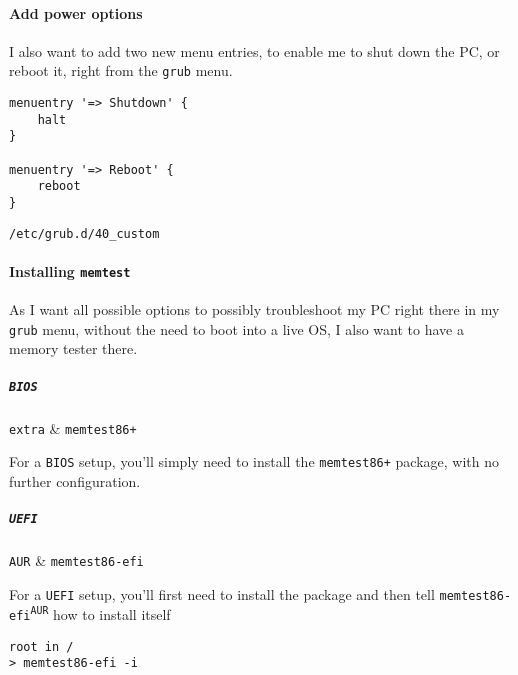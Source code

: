 \documentclass[10pt]{dustdoc}
\begin{document}
\paragraph{Add power options}%
\label{par:add-power-options}

I also want to add two new menu entries, to enable me to shut down the PC, or reboot it, right from the \texttt{grub} menu.

\begin{mintedlisting}
    \begin{verbatim}
menuentry '=> Shutdown' {
    halt
}

menuentry '=> Reboot' {
    reboot
}
    \end{verbatim}

    \caption{\texttt{/etc/grub.d/40_custom}}
\end{mintedlisting}

\paragraph{Installing \texttt{memtest}}%
\label{par:installing-memtest}

As I want all possible options to possibly troubleshoot my PC right there in my \texttt{grub} menu,  without the need to boot into a live OS, I also want to have a memory tester there.

\subparagraph{\texttt{BIOS}}%
\label{par:installing-memtest-bios}

\begin{pkgtable}
    \texttt{extra} & \texttt{memtest86+} \\
\end{pkgtable}

For a \texttt{BIOS} setup, you’ll simply need to install the \texttt{memtest86+} package, with no further configuration.

\subparagraph{\texttt{UEFI}}%
\label{par:installing-memtest-uefi}

\begin{pkgtable}
    \texttt{AUR} & \texttt{memtest86-efi} \\
\end{pkgtable}

For a \texttt{UEFI} setup, you’ll first need to install the package and then tell \texttt{memtest86-efi\textsuperscript{\texttt{AUR}}} how to install itself

\begin{verbatim}
root in /
> memtest86-efi -i
\end{verbatim}
\end{document}
